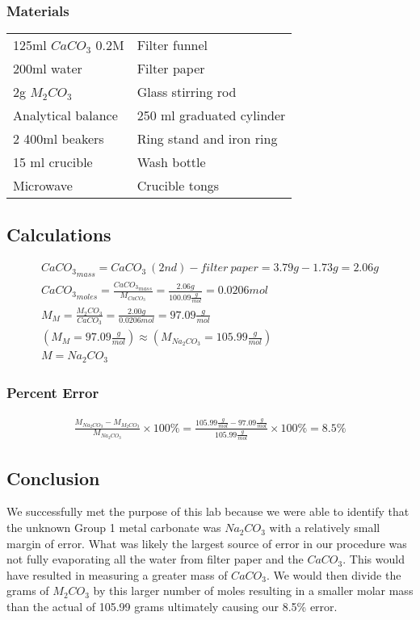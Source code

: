 \documentclass{article}
\begin{document}
\subsubsection{Materials}

\begin{tabular}{p{5cm}|p{5cm}}
    \toprule
    \midrule
    125ml \(CaCO_3\) 0.2M & Filter funnel \\
    200ml water & Filter paper \\
    2g \(M_2CO_3\) & Glass stirring rod \\
    Analytical balance & 250 ml graduated cylinder \\
    2 400ml beakers & Ring stand and iron ring \\
    15 ml crucible & Wash bottle \\
    Microwave & Crucible tongs \\
    \bottomrule
\end{tabular}

\subsection{Calculations}

\begin{gather}
    {CaCO_3}_{mass} = CaCO_3\ (2nd) - filter\ paper = 3.79g - 1.73g = 2.06g \\
    {CaCO_3}_{moles} = \frac{{CaCO_3}_{mass}}{M_{CaCO_3}} = \frac{2.06g}{100.09\frac{g}{mol}} = 0.0206mol \\
    M_M = \frac{M_2CO_3}{CaCO_3} = \frac{2.00g}{0.0206mol} = 97.09\frac{g}{mol} \\
    \left( M_M = 97.09\frac{g}{mol} \right) \approx \left( M_{Na_2CO_3} = 105.99\frac{g}{mol} \right) \\
    M = Na_2CO_3
\end{gather}

\subsubsection{Percent Error}

\begin{gather}
    \frac{M_{Na_2CO_3} - M_{M_2CO_3}}{M_{Na_2CO_3}} \times 100\% = \frac{105.99\frac{g}{mol} - 97.09\frac{g}{mol}}{105.99\frac{g}{mol}} \times 100\% = 8.5\%
\end{gather}

\subsection{Conclusion}

We successfully met the purpose of this lab because we were able to identify
that the unknown Group 1 metal carbonate was \(Na_2CO_3\) with a relatively
small margin of error. What was likely the largest source of error in our
procedure was not fully evaporating all the water from filter paper and the
\(CaCO_3\). This would have resulted in measuring a greater mass of \(CaCO_3\).
We would then divide the grams of \(M_2CO_3\) by this larger number of moles
resulting in a smaller molar mass than the actual of 105.99 grams ultimately
causing our 8.5\% error.
\end{document}
